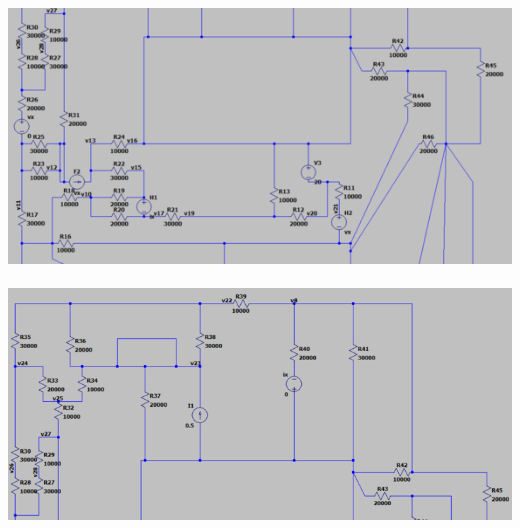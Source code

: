 \documentclass{article}
\begin{document}
\includegraphics[]{images/ltspice2_75.PNG}\\ \\
\includegraphics[]{images/ltspice3_70.PNG}\\ \\
\end{document}
